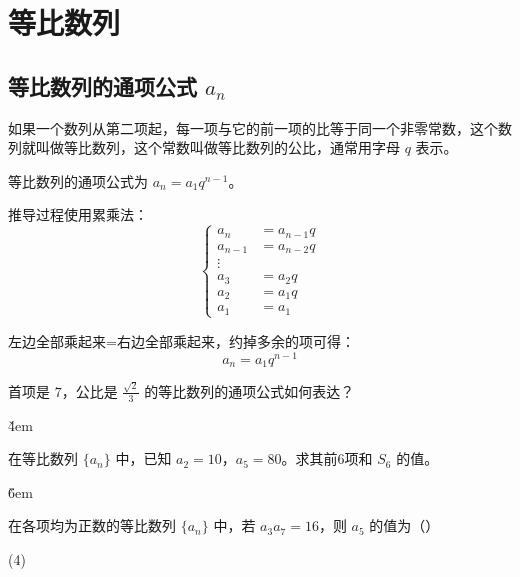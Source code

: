 \section{等比数列}

\subsection{等比数列的通项公式 $a_n$}

\begin{definition}
    如果一个数列从第二项起，每一项与它的前一项的比等于同一个非零常数，这个数列就叫做等比数列，这个常数叫做等比数列的公比，通常用字母 $q$ 表示。
\end{definition}

\begin{theorem}
    等比数列的通项公式为 $a_n = a_1 q^{n-1}$。

    推导过程使用累乘法：
    $$
        \begin{cases}
            a_n     & = a_{n-1} q \\
            a_{n-1} & = a_{n-2} q \\
            \vdots                \\
            a_3     & = a_2 q     \\
            a_2     & = a_1 q     \\
            a_1     & = a_1
        \end{cases}
    $$

    左边全部乘起来=右边全部乘起来，约掉多余的项可得：
    $$a_n=a_1 q^{n-1}$$
\end{theorem}

\begin{problem}
首项是 $7$，公比是 $\frac{\sqrt{2}}{3}$ 的等比数列的通项公式如何表达？
\end{problem}

\v{4em}

\begin{example}
    在等比数列 $\{a_n\}$ 中，已知 $a_2 = 10$，$a_5 = 80$。求其前6项和 $S_6$ 的值。
\end{example}

\v{6em}

\begin{example}
    在各项均为正数的等比数列 $\{a_n\}$ 中，若 $a_3 a_7 = 16$，则 $a_5$ 的值为（\qquad）
    \begin{tasks}(4)
    \end{tasks}
\end{example}

